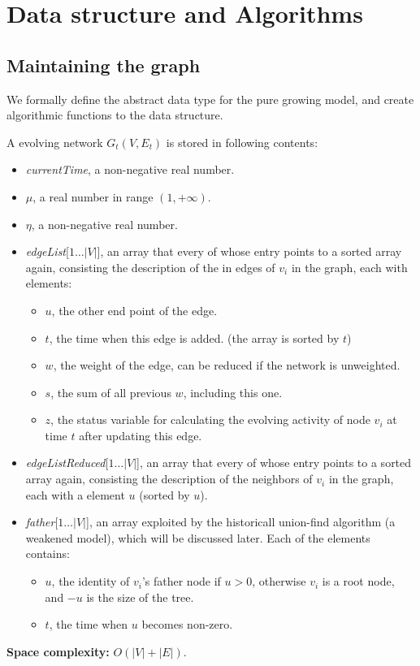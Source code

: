 \documentclass[12pt,abstract=true]{scrartcl}
\numberwithin{equation}{section}
\theoremstyle{definition}   \newtheorem{definition}{Definition}[section]
\theoremstyle{plain}        \newtheorem{theorem}{Theorem}[section]
\theoremstyle{plain}        \newtheorem{observation}{Observation}[section]
\theoremstyle{plain}        \newtheorem{fact}{Fact}[section]
\theoremstyle{plain}        \newtheorem{claim}{Claim}[section]
\theoremstyle{plain}        \newtheorem{lemma}[theorem]{Lemma}
\theoremstyle{plain}        \newtheorem{corollary}[theorem]{Corollary}
\theoremstyle{remark}       \newtheorem{example}{Example}[section]
\theoremstyle{remark}       \newtheorem{remark}{Remark}[section]
\begin{document}
\section{Data structure and Algorithms}
\subsection{Maintaining the graph}
We formally define the abstract data type for the pure growing model, and
create algorithmic functions to the data structure.

A evolving network $G_t(V,E_t)$ is stored in following contents:
\begin{itemize}
\item \textit{currentTime}, a non-negative real number.
\item $\mu$, a real number in range $(1,+\infty)$.
\item $\eta$, a non-negative real number.
\item \textit{edgeList}[$1\dots|V|$], an array that every of
whose entry points to a sorted array again, consisting the description of the
in edges of $v_i$ in the graph, each with elements:
\begin{itemize}
\item $u$, the other end point of the edge.
\item $t$, the time when this edge is added. (the array is sorted by $t$)
\item $w$, the weight of the edge, can be reduced if the network is
unweighted.
\item $s$, the sum of all previous $w$, including this one.
\item $z$, the status variable for calculating the evolving activity of node
$v_i$ at time $t$ after updating this edge.
\end{itemize}

\item \textit{edgeListReduced}[$1\dots|V|$], an array that every of
whose entry points to a sorted array again, consisting the description of the
neighbors of $v_i$ in the graph, each with a element $u$ (sorted by $u$).

\item \textit{father}[$1\dots|V|$], an array exploited by the historicall
union-find algorithm\cite{tarjan1975efficiency} (a weakened model), which
will be discussed later. Each of the elements contains:
\begin{itemize}
\item $u$, the identity of $v_i$'s father node if $u>0$, otherwise $v_i$
is a root node, and $-u$ is the size of the tree.
\item $t$, the time when $u$ becomes non-zero.
\end{itemize}

\end{itemize}
\textbf{Space complexity:} $O(|V|+|E|)$.
\end{document}
